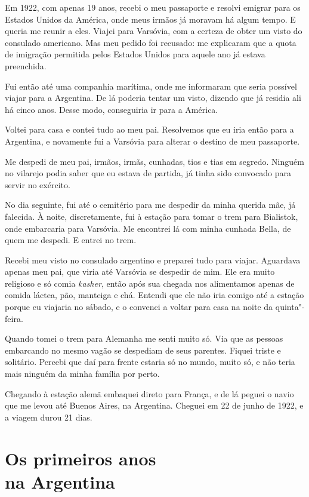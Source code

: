 Em 1922, com apenas 19 anos, recebi o meu passaporte e resolvi emigrar
para os Estados Unidos da América, onde meus irmãos já moravam
há algum tempo. E queria me reunir a eles. Viajei para Varsóvia, com
a certeza de obter um visto do consulado americano. Mas meu pedido 
foi recusado: me explicaram 
que a quota de imigração permitida pelos Estados Unidos para 
aquele ano já estava preenchida.

Fui então até uma companhia marítima, onde me informaram que seria possível
viajar para a Argentina. De lá poderia tentar um visto, dizendo que já residia ali há cinco anos. Desse modo, conseguiria ir para a América.

Voltei para casa e contei tudo ao meu pai. Resolvemos que eu
iria então para a Argentina, e novamente fui a Varsóvia para 
alterar o destino de meu passaporte.

Me despedi de meu pai, irmãos, irmãs, cunhadas, tios e tias em
segredo. Ninguém no vilarejo podia saber que eu estava de partida, já tinha 
sido convocado para servir no exército.%

No dia seguinte, fui até o cemitério para me despedir da minha querida
mãe, já falecida. À noite, discretamente, fui à estação para
tomar o trem para Bialistok, onde embarcaria para Varsóvia. Me encontrei lá 
com minha cunhada Bella, de quem me despedi. E entrei no trem.

Recebi meu visto no consulado argentino e preparei tudo para
viajar. Aguardava apenas meu pai, que viria até Varsóvia se despedir de mim.
Ele era muito religioso e só comia \textit{kasher}, então após sua chegada nos
alimentamos apenas de comida láctea, pão,
manteiga e chá. Entendi que ele não iria comigo até a estação porque
eu viajaria no sábado, e o convenci a voltar para casa na
noite da quinta"-feira. 

Quando tomei o trem para Alemanha me senti muito só. Via que as pessoas embarcando no mesmo vagão se despediam de seus parentes. Fiquei triste e solitário. Percebi que daí para frente estaria
só no mundo, muito só, e não teria mais ninguém da minha família por perto.

Chegando à estação alemã embaquei direto para França, e de lá peguei o navio que me
levou até Buenos Aires, na Argentina. Cheguei em 22 de junho de 1922, e a viagem durou 21 dias.

\chapter*{Os primeiros anos\\na Argentina}


